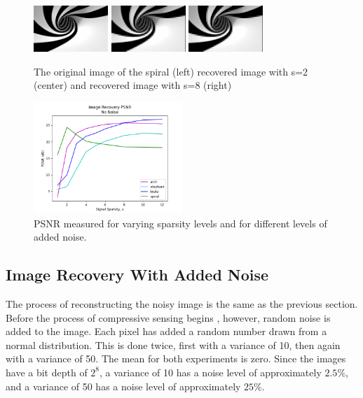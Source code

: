 \documentclass{article}
\begin{document}
\begin{figure}[H]
    \captionsetup{width=.75\linewidth}
    \centering
        \includegraphics[width=0.25\textwidth]{images/spiral.png}
        \includegraphics[width=0.25\textwidth]{images/spiral-recovered_02.png}
        \includegraphics[width=0.25\textwidth]{images/spiral-recovered_08.png}
        \caption{The original image of the spiral (left) recovered image with s=2 (center) and recovered image with s=8 (right)}
\end{figure}



\begin{figure}[H]
    \captionsetup{width=.5\linewidth}
    \centering
        \includegraphics[width=0.5\textwidth]{plots/d3-no-noise.png}
        \caption{PSNR measured for varying sparsity levels and for different levels of added noise.}
\end{figure}




\newpage
\subsection*{Image Recovery With Added Noise}

The process of reconstructing the noisy image is the same as the previous section.
Before the process of compressive sensing begins , however, random noise is added to the image.
Each pixel has added a random number drawn from a normal distribution.
This is done twice, first with a variance of 10, then again with a variance of 50.
The mean for both experiments is zero.
Since the images have a bit depth of $2^8$, a variance of 10 has a noise level of approximately $2.5\%$,
and a variance of 50 has a noise level of approximately $25\%$.
\end{document}
